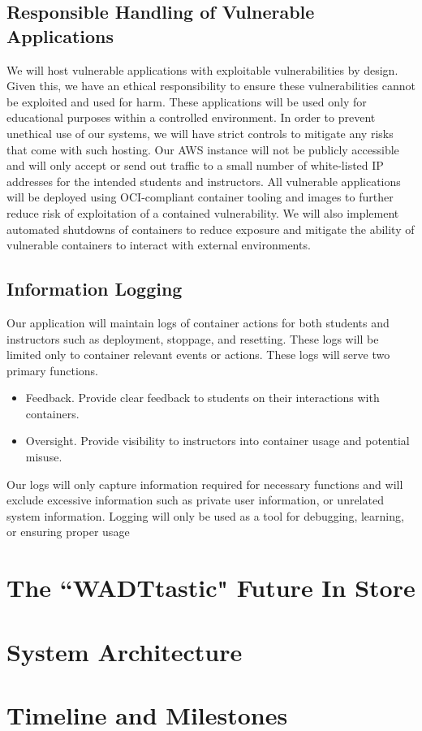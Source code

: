 \documentclass[12pt]{article}
\begin{document}
\subsection{Responsible Handling of Vulnerable Applications}
We will host vulnerable applications with exploitable vulnerabilities by design. Given this, we have an ethical responsibility to ensure these vulnerabilities cannot be exploited and used for harm. These applications will be used only for educational purposes within a controlled environment. In order to prevent unethical use of our systems, we will have strict controls to mitigate any risks that come with such hosting. Our AWS instance will not be publicly accessible and will only accept or send out traffic to a small number of white-listed IP addresses for the intended students and instructors. All vulnerable applications will be deployed using OCI-compliant container tooling and images to further reduce risk of exploitation of a contained vulnerability. We will also implement automated shutdowns of containers to reduce exposure and mitigate the ability of vulnerable containers to interact with external environments.


\subsection{Information Logging}
Our application will maintain logs of container actions for both students and instructors such as deployment, stoppage, and resetting. These logs will be limited only to container relevant events or actions. These logs will serve two primary functions.
\begin{itemize}
	\item Feedback. Provide clear feedback to students on their interactions with containers.
	\item Oversight. Provide visibility to instructors into container usage and potential misuse.
\end{itemize}

Our logs will only capture information required for necessary functions and will exclude excessive information such as private user information, or unrelated system information. Logging will only be used as a tool for debugging, learning, or ensuring proper usage

\section{The ``WADTtastic" Future In Store}



\section{System Architecture}


\section{Timeline and Milestones}

\printbibliography
\end{document}
